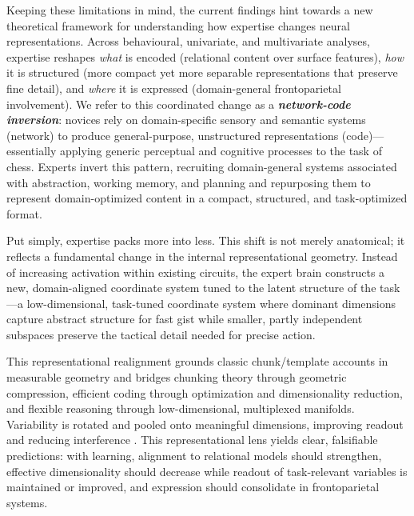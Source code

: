 \documentclass[preprint,12pt]{elsarticle}
\begin{document}
Keeping these limitations in mind, the current findings hint towards a new theoretical framework for understanding how expertise changes neural representations. Across behavioural, univariate, and multivariate analyses, expertise reshapes \emph{what} is encoded (relational content over surface features), \emph{how} it is structured (more compact yet more separable representations that preserve fine detail), and \emph{where} it is expressed (domain-general frontoparietal involvement). We refer to this coordinated change as a \textbf{\emph{network-code inversion}}: novices rely on domain-specific sensory and semantic systems (network) to produce general-purpose, unstructured representations (code)—essentially applying generic perceptual and cognitive processes to the task of chess. Experts invert this pattern, recruiting domain-general systems associated with abstraction, working memory, and planning and repurposing them to represent domain-optimized content in a compact, structured, and task-optimized format.

Put simply, expertise packs more into less. This shift is not merely anatomical; it reflects a fundamental change in the internal representational geometry. Instead of increasing activation within existing circuits, the expert brain constructs a new, domain-aligned coordinate system tuned to the latent structure of the task—a low-dimensional, task-tuned coordinate system where dominant dimensions capture abstract structure for fast gist while smaller, partly independent subspaces preserve the tactical detail needed for precise action.

This representational realignment grounds classic chunk/template accounts in measurable geometry and bridges chunking theory through geometric compression, efficient coding through optimization and dimensionality reduction, and flexible reasoning through low-dimensional, multiplexed manifolds. Variability is rotated and pooled onto meaningful dimensions, improving readout and reducing interference \cite{barlow1961possible, rigotti2013importance, chung2018classification, fusi2016neurons}. This representational lens yields clear, falsifiable predictions: with learning, alignment to relational models should strengthen, effective dimensionality should decrease while readout of task-relevant variables is maintained or improved, and expression should consolidate in frontoparietal systems.
\end{document}
